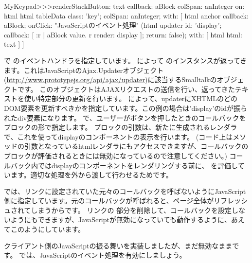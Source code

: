 \documentclass[a4paper,10pt,twoside]{book}
\begin{document}
\begin{code}{}
MyKeypad>>>renderStackButton: text callback: aBlock colSpan: anInteger on: html 
	html tableData
		class: 'key';
		colSpan: anInteger;
		with: [
			html anchor
				callback: aBlock;
				onClick:				"JavaScriptのイベント処理"
					(html updater
						id: 'display';
						callback: [ :r |
							aBlock value.
							r render: display ];
						return: false);
				with: [ html html: text ] ]
\end{code}

で のイベントハンドラを指定しています。
 によって のインスタンスが返ってきます。これはJavaScriptのAjax.Updaterオブジェクト(\url{http://www.prototypejs.org/api/ajax/updater})に該当するSmalltalkのオブジェクトです。
このオブジェクトはAJAXリクエストの送信を行い、返ってきたテキストを使い特定部分の更新を行います。
 によって、updaterにXHTMLのどのDOM要素を更新すべきかを指定しています。この例の場合は'display'のidが振られたdiv要素になります。
 で、ユーザーがボタンを押したときのコールバックをブロックの形で指定します。
ブロックの引数は、新たに生成されるレンダラで、これを使ってdisplayのコンポーネントの表示を行います。
(コード上はメソッドの引数となっているhtmlレンダラにもアクセスできますが、コールバックのブロックが評価されるときには無効になっているので注意してください。)
コールバック内ではdisplayのコンポーネントをレンダリングする前に、 を評価しています。適切な処理を外から渡して行わせるためです。

 では、リンクに設定されていた元々のコールバックを呼ばないようにJavaScript側に指定しています。元のコールバックが呼ばれると、ページ全体がリフレッシュされてしまうからです。
リンクの 部分を削除して、コールバックを設定しないようにもできますが、JavaScriptが無効になっていても動作するように、あえてこのようにしています。


クライアント側のJavaScriptの振る舞いを実装しましたが、まだ無効なままです。
では、JavaScriptのイベント処理を有効にしましょう。


\end{document}
